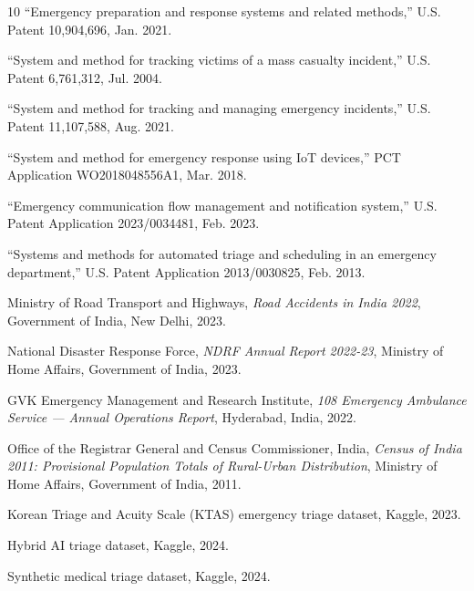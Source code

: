 \documentclass[conference]{IEEEtran}
\begin{document}
\begin{thebibliography}{10}
  ``Emergency preparation and response systems and related methods,'' U.S. Patent 10,904,696, Jan. 2021.

  ``System and method for tracking victims of a mass casualty incident,'' U.S. Patent 6,761,312, Jul. 2004.

  ``System and method for tracking and managing emergency incidents,'' U.S. Patent 11,107,588, Aug. 2021.

  ``System and method for emergency response using IoT devices,'' PCT Application WO2018048556A1, Mar. 2018.

  ``Emergency communication flow management and notification system,'' U.S. Patent Application 2023/0034481, Feb. 2023.

  ``Systems and methods for automated triage and scheduling in an emergency department,'' U.S. Patent Application 2013/0030825, Feb. 2013.

  Ministry of Road Transport and Highways, \emph{Road Accidents in India 2022}, Government of India, New Delhi, 2023.

  National Disaster Response Force, \emph{NDRF Annual Report 2022-23}, Ministry of Home Affairs, Government of India, 2023.

  GVK Emergency Management and Research Institute, \emph{108 Emergency Ambulance Service — Annual Operations Report}, Hyderabad, India, 2022.

  Office of the Registrar General and Census Commissioner, India, \emph{Census of India 2011: Provisional Population Totals of Rural-Urban Distribution}, Ministry of Home Affairs, Government of India, 2011.

  Korean Triage and Acuity Scale (KTAS) emergency triage dataset, Kaggle, 2023.

  Hybrid AI triage dataset, Kaggle, 2024.

  Synthetic medical triage dataset, Kaggle, 2024.

  \end{thebibliography}
\end{document}
